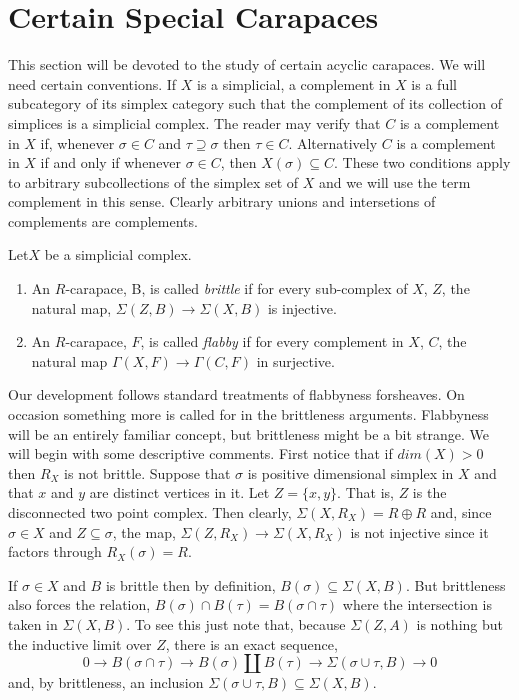 \section{Certain Special Carapaces}\label{chap6-sec-6}
This section will be devoted to the study of certain acyclic carapaces. We will need certain conventions. If $X$ is a simplicial, a complement in $X$ is a full subcategory of its simplex category such that the complement of its collection of simplices is a simplicial complex.  The reader may verify that $C$ is a complement in $X$ if, whenever $\sigma \in C$ and $\tau \supseteq \sigma$ then $\tau \in C$. Alternatively $C$ is a complement in $X$ if and only if whenever $\sigma \in C$, then $X (\sigma) \subseteq C$. These two conditions apply to arbitrary subcollections of the simplex set of $X$ and we will use the term complement in this sense. Clearly arbitrary unions and intersetions of complements are complements.

\begin{definition}\label{chap6-definition-6.1}
Let\pageoriginale $X$ be a simplicial complex.
    \begin{enumerate}[(1)]
    \item An $R$-carapace, B, is called \textit{brittle} if for every sub-complex of $X$, $Z$, the natural map, $\Sigma(Z, B) \rightarrow \Sigma(X, B)$ is injective.\label{chap6-definition6.1-1}
    \item An $R$-carapace, $F$, is called \textit{flabby} if for every complement in $X$, $C$, the natural map $\Gamma(X, F) \rightarrow \Gamma (C, F)$ in surjective.\label{chap6-definition6.1-2}
    \end{enumerate}
\end{definition}

Our development follows standard treatments of flabbyness for\break sheaves. On occasion something more is called for in the brittleness arguments. Flabbyness will be an entirely familiar concept, but brittleness might be a bit strange. We will begin with some descriptive comments. First notice that if $dim(X)>0$ then $R_{X}$ is not brittle. Suppose that $\sigma$ is positive dimensional simplex in $X$ and that $x$ and $y$ are distinct vertices in it. Let $Z=\{x, y\}$. That is, $Z$ is the disconnected two point complex. Then clearly, $\Sigma(X, R_{X})= R\oplus R$ and, since $\sigma \in X$ and $Z \subseteq \sigma$, the map, $\Sigma(Z, R_{X})\rightarrow \Sigma(X, R_{X})$ is not injective since it factors through $R_{X}(\sigma) = R$. 

If $\sigma \in X$ and $B$ is brittle then by definition, $B(\sigma) \subseteq \Sigma(X, B)$. But brittleness also forces the relation, $B(\sigma)\cap B(\tau) = B(\sigma \cap \tau)$ where the intersection is taken in $\Sigma(X, B)$. To see this just note that, because $\Sigma(Z, A)$ is nothing  but the inductive limit over $Z$, there is an exact sequence,
$$
0 \rightarrow B(\sigma \cap \tau) \rightarrow B(\sigma) \coprod B(\tau) \rightarrow \Sigma(\sigma \cup \tau, B)\rightarrow 0
$$
and, by brittleness, an inclusion $\Sigma(\sigma \cup \tau, B) \subseteq \Sigma(X, B)$.

